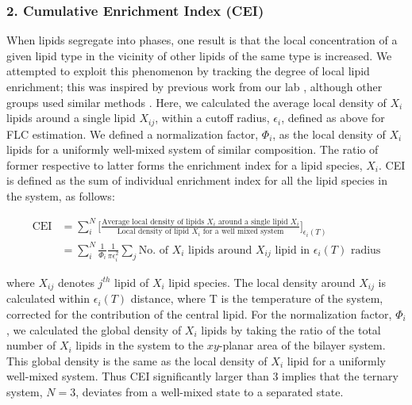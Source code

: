 \documentclass{biophys-new}
\begin{document}
\subsubsection*{2. Cumulative Enrichment Index (CEI)}

When lipids segregate into phases, one result is that the local concentration of a given lipid type in the vicinity of other lipids of the same type is increased. We attempted to exploit this phenomenon by tracking the degree of local lipid enrichment; this was inspired by previous work from our lab \cite{Grossfield2022}, although other groups used similar methods \cite{Gu2019, Gu2020}.
Here, we calculated the average local density of $X_i$ lipids around a single lipid $X_{ij}$, within a cutoff radius, $\epsilon_i$, defined as above for FLC estimation.
We defined a normalization factor, $\Phi_i$, as the local density of $X_i$ lipids for a uniformly well-mixed system of similar composition.
The ratio of former respective to latter forms the enrichment index for a lipid species, $X_i$.
CEI is defined as the sum of individual enrichment index for all the lipid species in the system, as follows:

\begin{equation}
    \begin{aligned}
        \label{eq:CEI}
        \text{CEI} {} & = \sum_{i}^{N}\Bigg[\frac{\text{Average local density of lipids $X_i$ around a single lipid $X_i$}}{\text{Local density of lipid $X_i$ for a well mixed system}}\Bigg]_{\text{$\epsilon_i(T)$}} \\
                      & =  \sum_{i}^{N} \frac{1}{\Phi_i}\frac{1}{\text{$\pi\epsilon_i^2$}}\sum_{j}\text{No. of $X_i$ lipids around $X_{ij}$ lipid in $\epsilon_i(T)$ radius}
    \end{aligned}
\end{equation}

\noindent where $X_{ij}$ denotes $j^{th}$ lipid of $X_i$ lipid species.
The local density around $X_{ij}$ is calculated within $\epsilon_i(T)$ distance, where T is the temperature of the system, corrected
for the contribution of the central lipid.
For the normalization factor, $\Phi_i$,  we calculated the global density of $X_i$ lipids by taking the ratio of the total number of $X_i$ lipids in the system to the $xy$-planar area of the bilayer system.
This global density is the same as the local density of $X_{i}$ lipid for a uniformly well-mixed system.
Thus CEI significantly larger than 3 implies that the ternary system, $N=3$, deviates from a well-mixed state to a separated state.
\end{document}
